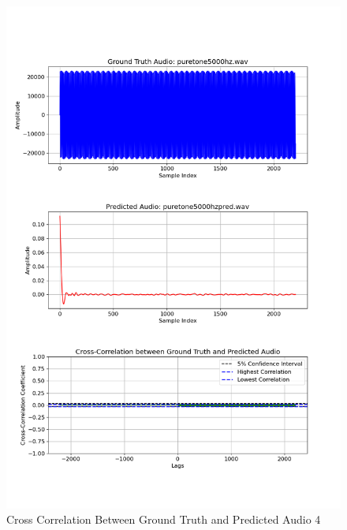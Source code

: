 \documentclass{ioereport}
\begin{document}
    \begin{figure}[H]
        \centering
        \includegraphics[width=\linewidth]{assets/crosscorrelation/cross_correlation_puretone5000hz.wav_puretone5000hzpred.wav.png}
        \caption{Cross Correlation Between Ground Truth and Predicted Audio 4}
        \label{fig:cross-correlation-4}
    \end{figure}
\end{document}
